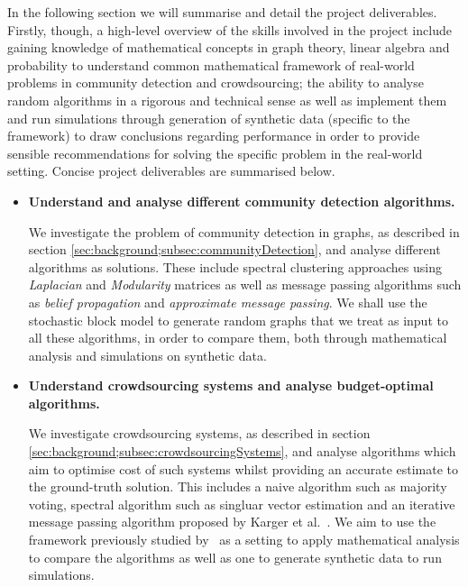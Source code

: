 \documentclass[12pt]{article}
\numberwithin{equation}{section}
\begin{document}
In the following section we will summarise and detail the project deliverables. Firstly, though, a high-level overview of the skills involved in the project include gaining knowledge of mathematical concepts in graph theory, linear algebra and probability to understand common mathematical framework of real-world problems in community detection and crowdsourcing; the ability to analyse random algorithms in a rigorous and technical sense as well as implement them and run simulations through generation of synthetic data (specific to the framework) to draw conclusions regarding performance in order to provide sensible recommendations for solving the specific problem in the real-world setting. Concise project deliverables are summarised below.
\begin{itemize}
	\item \textbf{Understand and analyse different community detection algorithms.}

	We investigate the problem of community detection in graphs, as described in section \ref{sec:background;subsec:communityDetection}, and analyse different algorithms as solutions. These include spectral clustering approaches using \textsl{Laplacian} and \textsl{Modularity} matrices as well as message passing algorithms such as \textsl{belief propagation} and \textsl{approximate message passing}. We shall use the stochastic block model to generate random graphs that we treat as input to all these algorithms, in order to compare them, both through mathematical analysis and simulations on synthetic data.

	\item \textbf{Understand crowdsourcing systems and analyse budget-optimal algorithms.}

	We investigate crowdsourcing systems, as described in section \ref{sec:background;subsec:crowdsourcingSystems}, and analyse algorithms which aim to optimise cost of such systems whilst providing an accurate estimate to the ground-truth solution. This includes a naive algorithm such as majority voting, spectral algorithm such as singluar vector estimation and an iterative message passing algorithm proposed by Karger et al.~\cite{KOS13}. We aim to use the framework previously studied by~\cite{KOS13} as a setting to apply mathematical analysis to compare the algorithms as well as one to generate synthetic data to run simulations.
\end{itemize}

\end{document}
